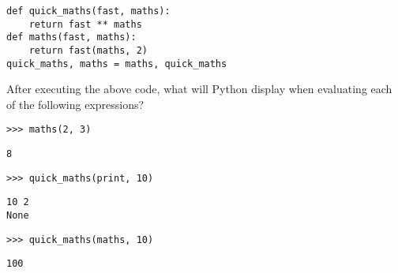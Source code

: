 \begin{blocksection}
\question

\begin{lstlisting}
def quick_maths(fast, maths): 
    return fast ** maths
def maths(fast, maths):
    return fast(maths, 2)
quick_maths, maths = maths, quick_maths
\end{lstlisting}

After executing the above code, what will Python
display when evaluating each of the following expressions?

\begin{lstlisting}
>>> maths(2, 3)
\end{lstlisting}
\begin{solution}[0.5in]
\begin{lstlisting}
8
\end{lstlisting}
\end{solution}

\begin{lstlisting}
>>> quick_maths(print, 10)
\end{lstlisting}
\begin{solution}[0.5in]
\begin{lstlisting}
10 2
None
\end{lstlisting}
\end{solution}

\begin{lstlisting}
>>> quick_maths(maths, 10)
\end{lstlisting}
\begin{solution}[0.5in]
\begin{lstlisting}
100
\end{lstlisting}
\end{solution}
\end{blocksection}
